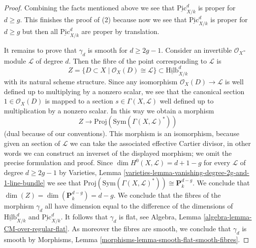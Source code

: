 \begin{proof}
\medskip\noindent
Combining the facts mentioned above we see that
$\underline{\text{Pic}}^d_{X/k}$ is proper for $d \geq g$.
This finishes the proof of (2) because now we see that
$\underline{\text{Pic}}^d_{X/k}$ is proper for $d \geq g$ but
then all $\underline{\text{Pic}}^d_{X/k}$ are proper by translation.

\medskip\noindent
It remains to prove that $\gamma_d$ is smooth for $d \geq 2g - 1$.
Consider an invertible $\mathcal{O}_X$-module $\mathcal{L}$ of degree
$d$. Then the fibre of the point corresponding to $\mathcal{L}$ is
$$
Z = \{D \subset X \mid \mathcal{O}_X(D) \cong \mathcal{L}\} \subset
\underline{\text{Hilb}}^d_{X/k}
$$
with its natural scheme structure. Since any isomorphism
$\mathcal{O}_X(D) \to \mathcal{L}$ is well defined up
to multiplying by a nonzero scalar, we see that the canonical
section $1 \in \mathcal{O}_X(D)$ is mapped to a section
$s \in \Gamma(X, \mathcal{L})$ well defined up to multiplication
by a nonzero scalar. In this way we obtain a morphism
$$
Z \longrightarrow
\text{Proj}(\text{Sym}(\Gamma(X, \mathcal{L})^*))
$$
(dual because of our conventions). This morphism is an isomorphism,
because given an section of $\mathcal{L}$ we can take the associated
effective Cartier divisor, in other words we can construct an inverset of
the displayed morphism; we omit the precise formulation and proof.
Since $\dim H^0(X, \mathcal{L}) = d + 1 - g$ for every
$\mathcal{L}$ of degree $d \geq 2g - 1$ by
Varieties, Lemma \ref{varieties-lemma-vanishing-degree-2g-and-1-line-bundle}
we see that $\text{Proj}(\text{Sym}(\Gamma(X, \mathcal{L})^*))
\cong \mathbf{P}^{d - g}_k$.
We conclude that $\dim(Z) = \dim(\mathbf{P}^{d - g}_k) = d - g$.
We conclude that the fibres of the morphism $\gamma_d$ all
have dimension equal to the difference of the dimensions of
$\underline{\text{Hilb}}^d_{X/k}$ and $\underline{\text{Pic}}^d_{X/k}$.
It follows that $\gamma_d$ is flat, see
Algebra, Lemma \ref{algebra-lemma-CM-over-regular-flat}.
As moreover the fibres are smooth, we conclude that $\gamma_d$
is smooth by Morphisms, Lemma \ref{morphisms-lemma-smooth-flat-smooth-fibres}.
\end{proof}











